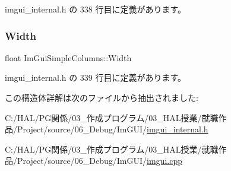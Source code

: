  imgui\+\_\+internal.\+h の 338 行目に定義があります。

\mbox{\label{struct_im_gui_simple_columns_a3b7ed6f3aa04e3ead1ea17e4d9f92767}} 
\subsubsection{\texorpdfstring{Width}{Width}}
{\footnotesize\ttfamily float Im\+Gui\+Simple\+Columns\+::\+Width}



 imgui\+\_\+internal.\+h の 339 行目に定義があります。



この構造体詳解は次のファイルから抽出されました\+:\begin{DoxyCompactItemize}
\item 
C\+:/\+H\+A\+L/\+P\+G関係/03\+\_\+作成プログラム/03\+\_\+\+H\+A\+L授業/就職作品/\+Project/source/06\+\_\+\+Debug/\+Im\+G\+U\+I/\mbox{\hyperlink{imgui__internal_8h}{imgui\+\_\+internal.\+h}}\item 
C\+:/\+H\+A\+L/\+P\+G関係/03\+\_\+作成プログラム/03\+\_\+\+H\+A\+L授業/就職作品/\+Project/source/06\+\_\+\+Debug/\+Im\+G\+U\+I/\mbox{\hyperlink{imgui_8cpp}{imgui.\+cpp}}\end{DoxyCompactItemize}
